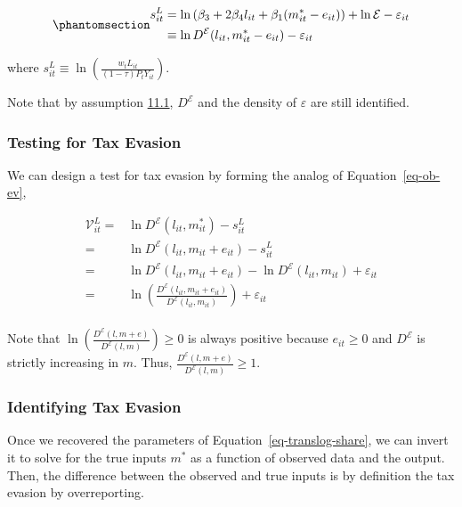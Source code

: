 \documentclass[
  12pt]{article}
\theoremstyle{definition}
\theoremstyle{remark}
\begin{document}
\begin{equation}\phantomsection\label{eq-translog-share}{
\begin{aligned}
    s_{it}^{L}&=\ln \left(\beta_3+2\beta_4l_{it}+\beta_1(m^*_{it}-e_{it})\right) + \ln \mathcal{E}- \varepsilon_{it} \\
    &\equiv \ln D^{\mathcal{E}}(l_{it},m^*_{it}-e_{it})- \varepsilon_{it} 
\end{aligned}
}\end{equation}

where
\(s_{it}^{L} \equiv\ln\left(\frac{w_t L_{it}}{(1-\tau)P_{t}Y_{it}}\right)\).

Note that by assumption \hyperref[ass-non-ev]{11.1}, \(D^{\mathcal{E}}\)
and the density of \(\varepsilon\) are still identified.

\subsubsection{Testing for Tax Evasion}\label{testing-for-tax-evasion}

We can design a test for tax evasion by forming the analog of
Equation~\ref{eq-ob-ev},

\[
\begin{aligned}
\mathcal{V}_{it}^{L} =&\ln D^{\mathcal{E}}(l_{it},m_{it}^*)-s_{it}^L\\
    =&\ln D^{\mathcal{E}}(l_{it},m_{it}+e_{it})-s_{it}^L\\
    =&\ln D^{\mathcal{E}}(l_{it},m_{it}+e_{it})-\ln D^{\mathcal{E}}(l_{it},m_{it})+\varepsilon_{it}\\
    =&\ln\left(\frac{D^{\mathcal{E}}(l_{it},m_{it}+e_{it})}{D^{\mathcal{E}}(l_{it},m_{it})}\right)+\varepsilon_{it}\\
\end{aligned}
\]

Note that
\(\ln\left(\frac{D^{\mathcal{E}}(l,m+e)}{D^{\mathcal{E}}(l,m)}\right)\ge0\)
is always positive because \(e_{it}\ge0\) and \(D^{\mathcal{E}}\) is
strictly increasing in \(m\). Thus,
\(\frac{D^{\mathcal{E}}(l,m+e)}{D^{\mathcal{E}}(l,m)}\ge1\).

\subsubsection{Identifying Tax Evasion}\label{identifying-tax-evasion-1}

Once we recovered the parameters of Equation~\ref{eq-translog-share}, we
can invert it to solve for the true inputs \(m^*\) as a function of
observed data and the output. Then, the difference between the observed
and true inputs is by definition the tax evasion by overreporting.
\end{document}
